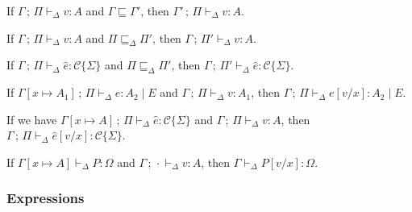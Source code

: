 \documentclass{article}
\newcommand{\mc}[1]{\mathcal{#1}}
\newcommand{\semi}{\,;\,}
\newcommand{\po}{\sqsubseteq}
\newcommand{\ptp}{A}
\newcommand{\tval}[4]{#1 \semi #2 \vdash_\Delta #3 : #4}
\newcommand{\texp}[5]{#1 \semi #2 \vdash_\Delta #3 : #4 \mid #5}
\newcommand{\tbod}[5]{#1 \semi #2 \vdash_\Delta #3 : #4\{#5\}}
\newcommand{\tprog}[3]{#1 \vdash_\Delta #2: #3}
\newcommand{\podl}{\sqsubseteq_\Delta}
\newcommand{\C}{\mc{C}}
\begin{document}
\begin{proposition}
\label{thm:wkgav}
If $\tval{\Gamma}{\Pi}{v}{\ptp}$ and $\Gamma \po \Gamma'$,
then $\tval{\Gamma'}{\Pi}{v}{\ptp}$.
\end{proposition}

\begin{proposition}
\label{thm:wkpiv}
If $\tval{\Gamma}{\Pi}{v}{\ptp}$ and $\Pi \podl \Pi'$,
then $\tval{\Gamma}{\Pi'}{v}{\ptp}$.
\end{proposition}

\begin{proposition}
\label{thm:wkpib}
If $\tbod{\Gamma}{\Pi}{\hat{e}}{\C}{\Sigma}$ and $\Pi \podl \Pi'$,
then $\tbod{\Gamma}{\Pi'}{\hat{e}}{\C}{\Sigma}$.
\end{proposition}

\begin{proposition}
\label{thm:subexp}
If $\texp{\Gamma[x \mapsto \ptp_1]}{\Pi}{e}{\ptp_2}{E}$
and $\tval{\Gamma}{\Pi}{v}{\ptp_1}$,
then $\texp{\Gamma}{\Pi}{e[v/x]}{\ptp_2}{E}$.
\end{proposition}

\begin{proposition}
\label{thm:subbod}
If we have $\tbod{\Gamma[x \mapsto \ptp]}{\Pi}{\hat{e}}{\C}{\Sigma}$
and $\tval{\Gamma}{\Pi}{v}{\ptp}$,
then $\tbod{\Gamma}{\Pi}{\hat{e}[v/x]}{\C}{\Sigma}$.
\end{proposition}

\begin{proposition}
\label{thm:subprog}
If $\tprog{\Gamma[x \mapsto \ptp]}{P}{\Omega}$
and $\tval{\Gamma}{\cdot}{v}{\ptp}$,
then $\tprog{\Gamma}{P[v/x]}{\Omega}$.
\end{proposition}

\subsubsection{Expressions}
\end{document}
